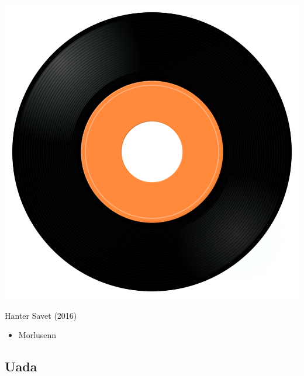 \begin{minipage}[t]{0.25\textwidth}
\captionsetup{type=figure}
\includegraphics[width=\textwidth]{Images/cover.png}
\caption*{Hanter Savet (2016)}
\end{minipage}
\begin{minipage}[t]{0.25\textwidth}\vspace{0pt}
\begin{itemize}[nosep,leftmargin=1em,labelwidth=*,align=left]
	\setlength{\itemsep}{0pt}
	\item Morlusenn 
\end{itemize}
\end{minipage}

\subsection{Uada}

